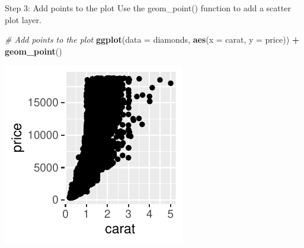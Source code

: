 \documentclass[
  ignorenonframetext,
]{beamer}
\newenvironment{Shaded}{\begin{snugshade}}{\end{snugshade}}
\newcommand{\AttributeTok}[1]{\textcolor[rgb]{0.13,0.29,0.53}{#1}}
\newcommand{\CommentTok}[1]{\textcolor[rgb]{0.56,0.35,0.01}{\textit{#1}}}
\newcommand{\FunctionTok}[1]{\textcolor[rgb]{0.13,0.29,0.53}{\textbf{#1}}}
\newcommand{\NormalTok}[1]{#1}
\newcommand{\SpecialCharTok}[1]{\textcolor[rgb]{0.81,0.36,0.00}{\textbf{#1}}}
\begin{document}
\begin{frame}[fragile]{Step 3: Add points to the plot}
\label{step-3-add-points-to-the-plot}
Use the geom\_point() function to add a scatter plot layer.


\begin{Shaded}
\begin{Highlighting}[]
\CommentTok{\# Add points to the plot}
\FunctionTok{ggplot}\NormalTok{(}\AttributeTok{data =}\NormalTok{ diamonds, }\FunctionTok{aes}\NormalTok{(}\AttributeTok{x =}\NormalTok{ carat, }\AttributeTok{y =}\NormalTok{ price)) }\SpecialCharTok{+} \FunctionTok{geom\_point}\NormalTok{()}
\end{Highlighting}
\end{Shaded}

\begin{center}\includegraphics[width=0.5\linewidth]{Figs/unnamed-chunk-3-1} \end{center}
\end{frame}
\end{document}
